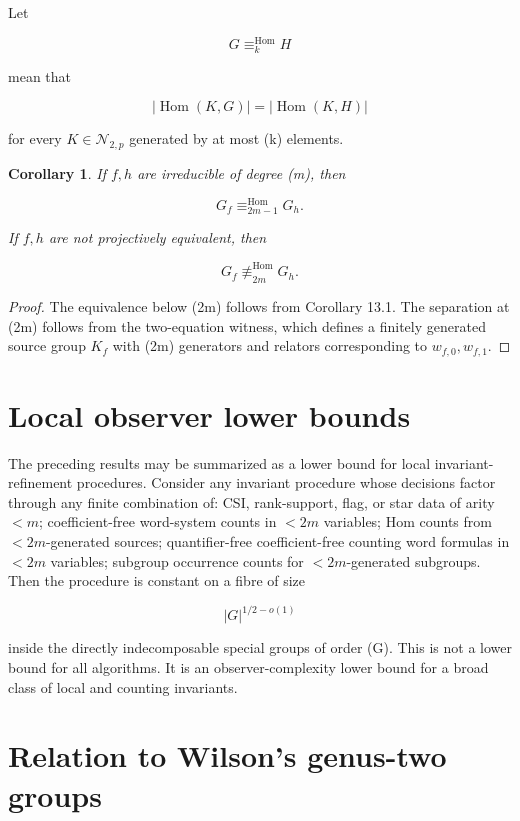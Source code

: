 \documentclass[11pt]{article}
\newtheorem{corollary}[theorem]{Corollary}
\begin{document}
Let

\[
G\equiv_k^{\mathrm{Hom}}H
\]

mean that

\[
|\operatorname{Hom}(K,G)|
=|\operatorname{Hom}(K,H)|
\]

for every $K\in\mathcal N_{2,p}$ generated by at most (k) elements.

\begin{corollary}
If $f,h$ are irreducible of degree (m), then

\[
G_f\equiv_{2m-1}^{\mathrm{Hom}}G_h.
\]

If $f,h$ are not projectively equivalent, then

\[
G_f\not\equiv_{2m}^{\mathrm{Hom}}G_h.
\]

\end{corollary}

\begin{proof}
The equivalence below (2m) follows from Corollary 13.1. The separation at (2m) follows from the two-equation witness, which defines a finitely generated source group $K_f$ with (2m) generators and relators corresponding to $w_{f,0},w_{f,1}$.

\end{proof}

\section{Local observer lower bounds}

The preceding results may be summarized as a lower bound for local invariant-refinement procedures. Consider any invariant procedure whose decisions factor through any finite combination of: CSI, rank-support, flag, or star data of arity $<m$; coefficient-free word-system counts in $<2m$ variables; Hom counts from $<2m$-generated sources; quantifier-free coefficient-free counting word formulas in $<2m$ variables; subgroup occurrence counts for $<2m$-generated subgroups. Then the procedure is constant on a fibre of size

\[
|G|^{1/2-o(1)}
\]

inside the directly indecomposable special groups of order (G). This is not a lower bound for all algorithms. It is an observer-complexity lower bound for a broad class of local and counting invariants.

\section{Relation to Wilson's genus-two groups}
\end{document}
